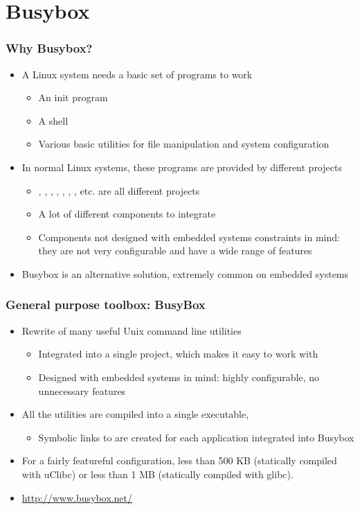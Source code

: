 \section{Busybox}

\begin{frame}
  \frametitle{Why Busybox?}
  \begin{itemize}
  \item A Linux system needs a basic set of programs to work
    \begin{itemize}
    \item An init program
    \item A shell
    \item Various basic utilities for file manipulation and system
      configuration
    \end{itemize}
  \item In normal Linux systems, these programs are provided by
    different projects
    \begin{itemize}
    \item {}, , , ,
      , , , etc. are all different
      projects
    \item A lot of different components to integrate
    \item Components not designed with embedded systems constraints in
      mind: they are not very configurable and have a wide range of
      features
    \end{itemize}
  \item Busybox is an alternative solution, extremely common on
    embedded systems
  \end{itemize}
\end{frame}

\begin{frame}
  \frametitle{General purpose toolbox: BusyBox}
  \begin{itemize}
  \item Rewrite of many useful Unix command line utilities
    \begin{itemize}
    \item Integrated into a single project, which makes it easy to
      work with
    \item Designed with embedded systems in mind: highly configurable,
      no unnecessary features
    \end{itemize}
  \item All the utilities are compiled into a single executable,
    \begin{itemize}
    \item Symbolic links to  are created for each
      application integrated into Busybox
    \end{itemize}
  \item For a fairly featureful configuration, less than 500 KB
    (statically compiled with uClibc) or less than 1 MB (statically
    compiled with glibc).
  \item   \url{http://www.busybox.net/}
  \end{itemize}
\end{frame}


